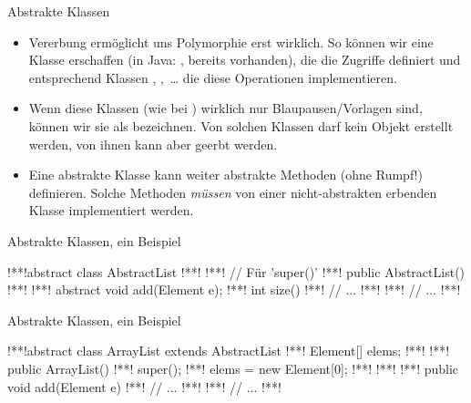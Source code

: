 \begin{frame}{Abstrakte Klassen}
    \begin{itemize}[<+(1)->]
        \widei
        \item Vererbung ermöglicht uns Polymorphie erst wirklich.\pause{} So können wir eine Klasse  erschaffen (in Java: , bereits vorhanden), die die Zugriffe definiert und entsprechend Klassen , ,~\ldots\pause{} die diese Operationen implementieren.
        \item Wenn diese Klassen (wie bei ) wirklich nur Blaupausen/Vorlagen sind,\pause{} können wir sie als  bezeichnen.\pause{} Von solchen Klassen darf kein Objekt erstellt werden,\pause{} von ihnen kann aber geerbt werden.
        \item Eine abstrakte Klasse kann weiter abstrakte Methoden (ohne Rumpf!) definieren.\pause{} Solche Methoden \emph{müssen} von einer nicht-abstrakten erbenden Klasse implementiert werden.
    \end{itemize}
\end{frame}

\begin{frame}[fragile,c]{Abstrakte Klassen, ein Beispiel}
\begin{plainjava}
!**!abstract class AbstractList {
!**!
!**!    // Für 'super()'
!**!    public AbstractList() { }
!**!
!**!    abstract void add(Element e);
!**!    int size() {
!**!        // ...
!**!    }
!**!    // ...
!**!}
\end{plainjava}
\end{frame}


\begin{frame}[fragile,c]{Abstrakte Klassen, ein Beispiel}
\begin{plainjava}
!**!abstract class ArrayList extends AbstractList {
!**!    Element[] elems;
!**!
!**!    public ArrayList() {
!**!        super();
!**!        elems = new Element[0];
!**!    }
!**!
!**!    public void add(Element e) {
!**!        // ...
!**!    }
!**!    // ...
!**!}
\end{plainjava}
\end{frame}



